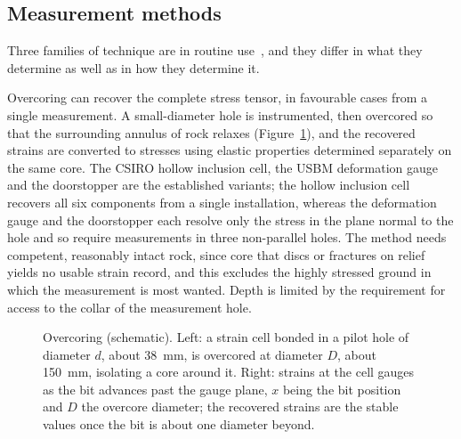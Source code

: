 \subsection{Measurement methods}
\label{sec:measurement-methods}

Three families of technique are in routine use~\citep{amadei1997stress}, and
they differ in what they
determine as well as in how they determine it.

Overcoring can recover the complete stress tensor, in favourable cases from
a single measurement. A
small-diameter hole is instrumented, then overcored so that the surrounding
annulus of rock relaxes (Figure~\ref{fig:overcoring-schematic}), and the
recovered strains are converted to stresses
using elastic properties determined separately on the same core. The CSIRO
hollow inclusion cell, the USBM deformation gauge and the doorstopper are the
established variants; the hollow inclusion cell recovers all six components
from a single installation, whereas the deformation gauge and the doorstopper
each resolve only the stress in the plane normal to the hole and so require
measurements in three non-parallel holes. The method needs competent, reasonably intact rock, since
core that discs or fractures on relief yields no usable strain record, and
this excludes the highly stressed ground in which the measurement is
most wanted. Depth is limited by the requirement for access to the collar of
the measurement hole.

\begin{figure}[htbp]
\centering
{}
\caption{Overcoring (schematic). Left: a strain cell bonded in a pilot hole of diameter $d$, about 38~mm, is overcored at diameter $D$, about 150~mm, isolating a core around it. Right: strains at the cell gauges as the bit advances past the gauge plane, $x$ being the bit position and $D$ the overcore diameter; the recovered strains are the stable values once the bit is about one diameter beyond.}
\label{fig:overcoring-schematic}
\end{figure}

